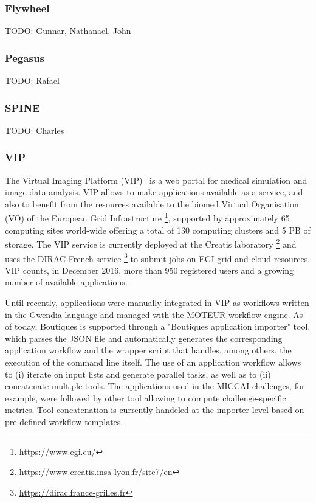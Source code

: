 \documentclass{article}
\newcommand{\todo}[1]{\color{red}TODO: #1\color{black}}
\begin{document}
\subsubsection{Flywheel}

\todo{Gunnar, Nathanael, John}

\subsubsection{Pegasus}

\todo{Rafael}

\subsubsection{SPINE}

\todo{Charles}

\subsubsection{VIP}

The Virtual Imaging Platform (VIP)~\cite{GLAT-13} is a web portal for medical 
simulation  and image data analysis. VIP allows to make applications 
available as a service, and also to benefit from the resources available 
to the biomed Virtual Organisation (VO) of the European Grid Infrastructure 
\footnote{\url{https://www.egi.eu/}}, supported by approximately 65 computing
sites world-wide offering a total of 130 computing clusters
and 5 PB of storage. The VIP service is currently deployed at the Creatis laboratory
\footnote{\url{https://www.creatis.insa-lyon.fr/site7/en}} and uses the DIRAC 
French service \footnote{\url{https://dirac.france-grilles.fr}} to submit jobs on 
EGI grid and cloud resources.  VIP counts, in December 2016, more than 950 
registered users and a growing number of available applications. 

Until recently, applications were manually integrated in VIP as workflows written 
in the Gwendia\cite{MONT-09} language and managed  with the MOTEUR\cite{GLAT-08} workflow engine. 
As of today, Boutiques is supported through a "Boutiques application importer" tool, which 
parses the JSON file and automatically generates the corresponding application workflow
and the wrapper script that handles, among others, the execution of the command line itself. 
The use of an application workflow allows to (i) iterate on input lists and generate 
parallel tasks, as well as to (ii) concatenate multiple tools. The applications used in 
the MICCAI challenges, for example, were followed by other tool allowing to compute 
challenge-specific metrics. Tool concatenation is currently handeled at the importer 
level based on pre-defined workflow templates. 
\end{document}
